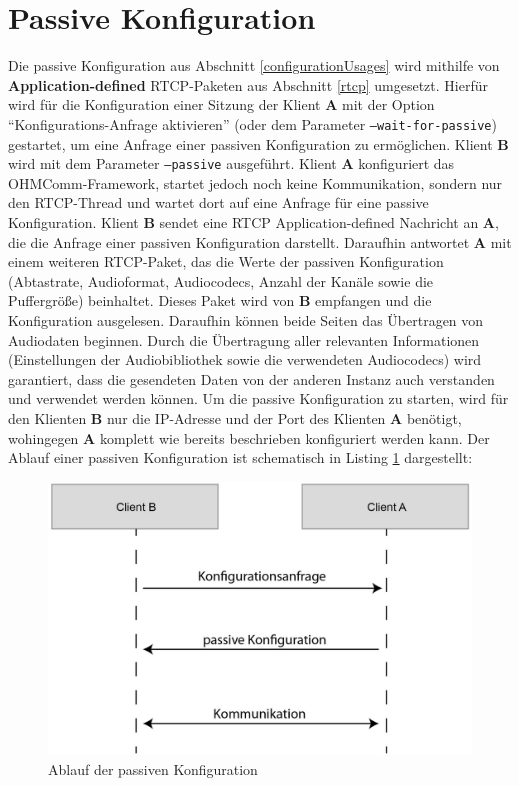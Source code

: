 \FloatBarrier
\section{Passive Konfiguration}
\label{passiveConfiguration}
Die passive Konfiguration aus Abschnitt \ref{configurationUsages} wird mithilfe von \textbf{Application-defined} RTCP-Paketen aus Abschnitt \ref{rtcp} umgesetzt. Hierfür wird für die Konfiguration einer Sitzung der Klient \textbf{A} mit der Option \enquote{Konfigurations-Anfrage aktivieren} (oder dem Parameter \texttt{--wait-for-passive}) gestartet, um eine Anfrage einer passiven Konfiguration zu ermöglichen. Klient \textbf{B} wird mit dem Parameter \texttt{--passive} ausgeführt. Klient \textbf{A} konfiguriert das OHMComm-Framework, startet jedoch noch keine Kommunikation, sondern nur den RTCP-Thread und wartet dort auf eine Anfrage für eine passive Konfiguration. Klient \textbf{B} sendet eine RTCP Application-defined Nachricht an \textbf{A}, die die Anfrage einer passiven Konfiguration darstellt. Daraufhin antwortet \textbf{A} mit einem weiteren RTCP-Paket, das die Werte der passiven Konfiguration (Abtastrate, Audioformat, Audiocodecs, Anzahl der Kanäle sowie die Puffergröße) beinhaltet. Dieses Paket wird von \textbf{B} empfangen und die Konfiguration ausgelesen. Daraufhin können beide Seiten das Übertragen von Audiodaten beginnen. Durch die Übertragung aller relevanten Informationen (Einstellungen der Audiobibliothek sowie die verwendeten Audiocodecs) wird garantiert, dass die gesendeten Daten von der anderen Instanz auch verstanden und verwendet werden können. Um die passive Konfiguration zu starten, wird für den Klienten \textbf{B} nur die IP-Adresse und der Port des Klienten \textbf{A} benötigt, wohingegen \textbf{A} komplett wie bereits beschrieben konfiguriert werden kann. Der Ablauf einer passiven Konfiguration ist schematisch in Listing \ref{lst:passiveConfiguration} dargestellt:
\newline
\begin{figure}[htp]
\centering
\includegraphics[width=.75\textwidth]{../img/passiveConfiguration}
\caption{Ablauf der passiven Konfiguration}
\label{lst:passiveConfiguration}
\end{figure}

